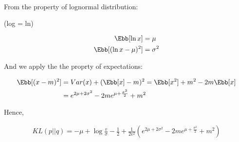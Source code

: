 \documentclass[12pt, xcolor=dvipsnames,svgnames,x11names]{article}
\begin{document}
From the property of lognormal distribution:

(log = ln)

\begin{align*}
\Ebb[\ln x] & = \mu\\
\Ebb[(\ln x - \mu)^2] & = \sigma^2
\end{align*}

And we apply the the proprty of expectations:

\begin{align*}
\Ebb[(x - m)^2] & = Var(x) + ( \Ebb[x] - m)^2 = \Ebb[x^2] + m^2 - 2m \Ebb[x]\\
 & = e^{2\mu + 2\sigma^2} - 2m e^{\mu + \frac{\sigma^2}{2}} + m^2
\end{align*}

Hence,

\begin{align*}
KL(p||q) = -\mu + \log \frac{v}{\sigma} -\frac{1}{2} + \frac{1}{2v^2} (e^{2\mu + 2\sigma^2} - 2m e^{\mu + \frac{\sigma^2}{2}} + m^2 )
\end{align*}
\end{document}
